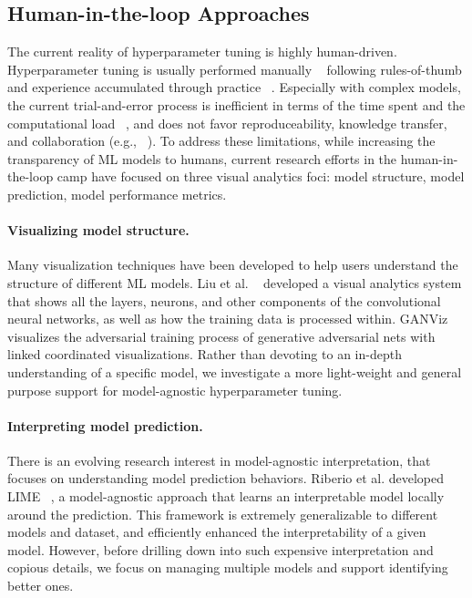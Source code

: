 \documentclass[preprint]{vgtc}        %
\begin{document}
\subsection {Human-in-the-loop Approaches}
The current reality of hyperparameter tuning is highly human-driven. Hyperparameter tuning is usually performed manually ~\cite{Claesen2015HyperparameterLearning} following rules-of-thumb and experience accumulated through practice ~\cite{Hinton2010AMachines,HsuAClassification}. Especially with complex models, the current trial-and-error process is inefficient in terms of the time spent and the computational load ~\cite{Pretorius2011VisualizationAnalysis}, and does not favor reproduceability, knowledge transfer, and collaboration (e.g., ~\cite{Claesen2014EasyOptunity}). To address these limitations, while increasing the transparency of ML models to humans, current research efforts in the human-in-the-loop camp have focused on three visual analytics foci: model structure, model prediction, model performance metrics.

\paragraph{Visualizing model structure.} Many visualization techniques have been developed to help users understand the structure of different ML models. 
Liu et al. ~\cite{Liu2016TowardsNetworks} developed a visual analytics system that shows all the layers, neurons, and other components of the convolutional neural networks, as well as how the training data is processed within. GANViz ~\cite{WangGANViz:Game} visualizes the adversarial training process of generative adversarial nets with linked coordinated visualizations. Rather than devoting to an in-depth understanding of a specific model, we investigate a more light-weight and general purpose support for model-agnostic hyperparameter tuning.

\paragraph{Interpreting model prediction.} There is an evolving research interest in model-agnostic interpretation, that focuses on understanding model prediction behaviors.
Riberio et al. developed LIME ~\cite{Ribeiro2016quotWhyYouquot}, a model-agnostic approach that learns an interpretable model locally around the prediction. This framework is extremely generalizable to different models and dataset, and efficiently enhanced the interpretability of a given model. However, before drilling down into such expensive interpretation and copious details, we focus on managing multiple models and support identifying better ones.
\end{document}

